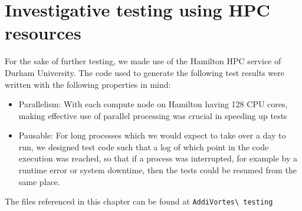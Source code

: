 \documentclass[11pt,twoside,a4paper]{article}
\begin{document}
\section{Investigative testing using HPC resources}
For the sake of further testing, we made use of the Hamilton HPC service of Durham University. The code used to generate the following test results were written with the following properties in mind:
\begin{itemize}
\item Parallelism: With each compute node on Hamilton having 128 CPU cores, making effective use of parallel processing was crucial in speeding up tests
\item Pausable: For long processes which we would expect to take over a day to run, we designed test code such that a log of which point in the code execution was reached, so that if a process was interrupted, for example by a runtime error or system downtime, then the tests could be resumed from the same place.
\end{itemize}
The files referenced in this chapter can be found at \nolinkurl{AddiVortes\ testing}\cite{repo}
\end{document}

